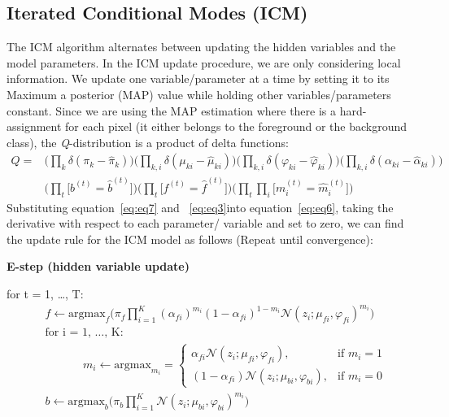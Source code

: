 \documentclass{article} %
\begin{document}
\subsection{Iterated Conditional Modes (ICM)}
\label{icm}
The ICM algorithm alternates between updating the hidden variables and the model parameters. In the ICM update procedure, we are only considering local information. We update one variable/parameter at a time by setting it to its Maximum a posterior (MAP) value while holding other variables/parameters constant. Since we are using the MAP estimation where there is a hard-assignment for each pixel (it either belongs to the foreground or the background class), the \textit{Q}-distribution is a product of delta functions:
\begin{equation} \label{eq:eq7}
\begin{split}
Q = &\Bigg( \prod_{k}\delta(\pi_k-\hat{\pi}_k) \Bigg) \Bigg( \prod_{k,i}\delta(\mu_{ki}-\hat{\mu}_{ki}) \Bigg)\Bigg( \prod_{k,i}\delta(\varphi_{ki}-\hat{\varphi}_{ki}) \Bigg)\Bigg( \prod_{k,i}\delta(\alpha_{ki}-\hat{\alpha}_{ki}) \Bigg) \\
&\Bigg( \prod_{t}\Big[b^{(t)} = \hat{b}^{(t)}\Big] \Bigg)\Bigg( \prod_{t}\Big[f^{(t)} = \hat{f}^{(t)}\Big] \Bigg)\Bigg( \prod_{t}\prod_{i}\Big[m_i^{(t)} = \hat{m}_i^{(t)}\Big] \Bigg)
\end{split}
\end{equation}
Substituting equation~\ref{eq:eq7} and ~\ref{eq:eq3}into equation~\ref{eq:eq6}, taking the derivative with respect to each parameter/ variable and set to zero, we can find the update rule for the ICM model as follows (Repeat until convergence):

\textbf{E-step (hidden variable update)}

for t = 1, \ldots , T:
\begin{align*} 
&f \leftarrow \text{argmax}_{f}\Bigg(\pi_f \prod_{i=1}^K {(\alpha_{fi})}^{m_{i}} {(1-\alpha_{fi})}^{1-m_{i}}\mathcal{N}(z_i;\mu_{fi},\varphi_{fi})^{m_{i}}\Bigg)\\
&\text{for i = 1, \ldots , K: } \\
& \text{ }\text{ }\text{ }\text{ }\text{ }m_i \leftarrow \text{argmax}_{m_i}=\begin{cases}
\alpha_{fi}\mathcal{N}(z_i;\mu_{fi},\varphi_{fi}), & \text{if $m_i = 1$}\\
(1-\alpha_{fi})\mathcal{N}(z_i;\mu_{bi},\varphi_{bi}), & \text{if $m_i = 0$}
\end{cases} \\
&b \leftarrow \text{argmax}_{b}\Bigg(\pi_b \prod_{i=1}^K \mathcal{N}(z_i;\mu_{bi},\varphi_{bi})^{m_{i}}\Bigg)
\end{align*} 
\end{document}
